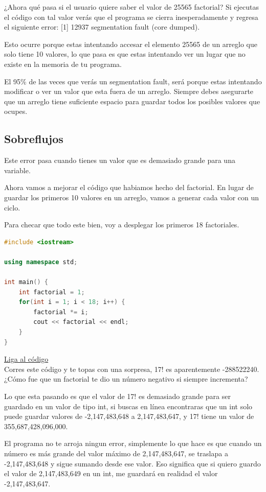 \documentclass{article}
\begin{document}
¿Ahora qué pasa si el usuario quiere saber el valor de 25565 factorial? Si ejecutas el código con tal valor verás que el programa se cierra inesperadamente y regresa el siguiente error: [1] 12937 segmentation fault (core dumped).

Esto ocurre porque estas intentando accesar el elemento 25565 de un arreglo que solo tiene 10 valores, lo que pasa es que estas intentando ver un lugar que no existe en la memoria de tu programa.

El 95\% de las veces que verás un segmentation fault, será porque estas intentando modificar o ver un valor que esta fuera de un arreglo. Siempre debes asegurarte que un arreglo tiene suficiente espacio para guardar todos los posibles valores que ocupes.

\subsection{Sobreflujos}
Este error pasa cuando tienes un valor que es demasiado grande para una variable.

Ahora vamos a mejorar el código que habiamos hecho del factorial. En lugar de guardar los primeros 10 valores en un arreglo, vamos a generar cada valor con un ciclo.

Para checar que todo este bien, voy a desplegar los primeros 18 factoriales.

\begin{lstlisting}[language=C++, caption=Sobreflujo]
#include <iostream>

using namespace std;

int main() {
    int factorial = 1;
    for(int i = 1; i < 18; i++) {
        factorial *= i;
        cout << factorial << endl;
    }
}
\end{lstlisting}
\href{https://repl.it/@Jamesscn/Sobrefactorial}{Liga al código}\\

Corres este código y te topas con una sorpresa, 17! es aparentemente -288522240. ¿Cómo fue que un factorial te dio un número negativo si siempre incrementa?

Lo que esta pasando es que el valor de 17! es demasiado grande para ser guardado en un valor de tipo int, si buscas en línea encontraras que un int solo puede guardar valores de -2,147,483,648 a 2,147,483,647, y 17! tiene un valor de 355,687,428,096,000.

El programa no te arroja ningun error, simplemente lo que hace es que cuando un número es más grande del valor máximo de 2,147,483,647, se traslapa a -2,147,483,648 y sigue sumando desde ese valor. Eso significa que si quiero guardo el valor de 2,147,483,649 en un int, me guardará en realidad el valor -2,147,483,647.
\end{document}
